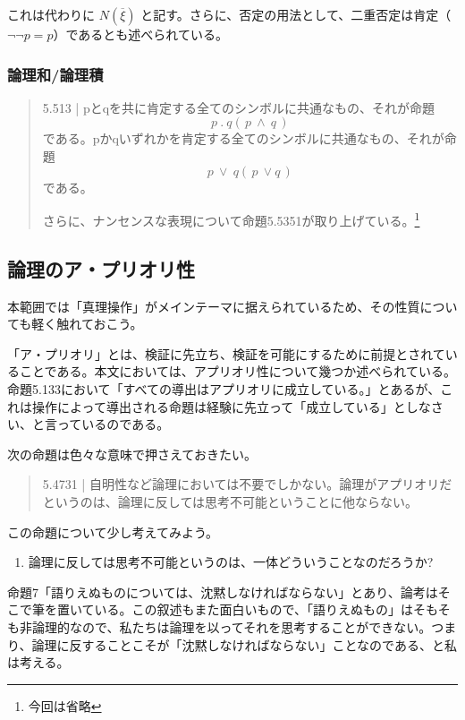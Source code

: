 \documentclass[a4paper,onecolumn,article]{jarticle}
\newcounter{ct}               %
\begin{document}
これは代わりに
$ N( \overline{ \xi } ) $
と記す。さらに、否定の用法として、二重否定は肯定（$\lnot \lnot p = p$）であるとも述べられている。
\subsubsection{論理和/論理積}
\begin{quote}
  5.513 | pとqを共に肯定する全てのシンボルに共通なもの、それが命題
  \[
     p \ . \ q  ( \, p \ \land \ q\, )
  \]
    である。pかqいずれかを肯定する全てのシンボルに共通なもの、それが命題
  \[
     p \ \vee \ q (\,p \ \lor q \,)
  \]
    である。

  さらに、ナンセンスな表現について命題5.5351が取り上げている。\footnote{今回は省略}
\end{quote}


\subsection{論理のア・プリオリ性}

本範囲では「真理操作」がメインテーマに据えられているため、その性質についても軽く触れておこう。

「ア・プリオリ」とは、検証に先立ち、検証を可能にするために前提とされていることである。本文においては、アプリオリ性について幾つか述べられている。命題5.133において「すべての導出はアプリオリに成立している。」とあるが、これは操作によって導出される命題は経験に先立って「成立している」としなさい、と言っているのである。

次の命題は色々な意味で押さえておきたい。
\begin{quote}

  5.4731 | 自明性など論理においては不要でしかない。論理がアプリオリだというのは、論理に反しては思考不可能ということに他ならない。

\end{quote}

この命題について少し考えてみよう。
\begin{enumerate}
  \item 論理に反しては思考不可能というのは、一体どういうことなのだろうか?
\end{enumerate}

命題7「語りえぬものについては、沈黙しなければならない」とあり、論考はそこで筆を置いている。この叙述もまた面白いもので、「語りえぬもの」はそもそも非論理的なので、私たちは論理を以ってそれを思考することができない。つまり、論理に反することこそが「沈黙しなければならない」ことなのである、と私は考える。
\end{document}
